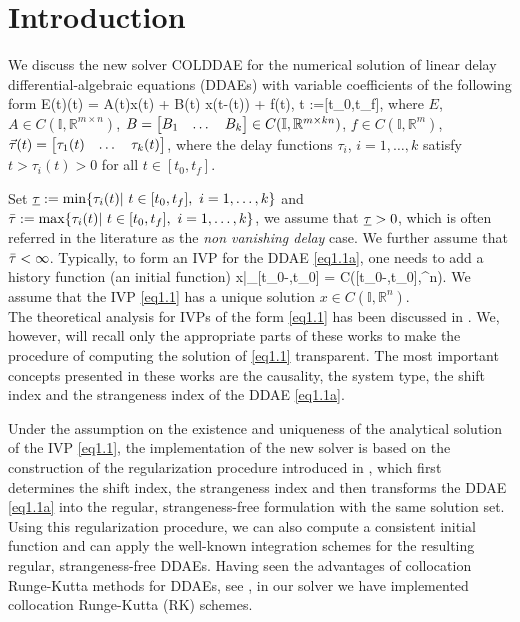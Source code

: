 \documentclass[final,reqno]{siamltex}
\begin{document}
\section{Introduction}
We discuss the new solver COLDDAE for the numerical solution of linear delay differential-algebraic equations (DDAEs) with variable coefficients of the following form
%
\bsq\label{eq1.1}
\be\label{eq1.1a}
 E(t)(t) = A(t)x(t) + B(t) x(t-\vtau(t)) + f(t), \quad t\in {} :=[t_0,t_f],
\ee
%
where $E$, $A \in C(\mathbb{I},\mathbb{R}^{m\times n})$, $B = \begin{bmatrix} B_1 & \dots & B_k \end{bmatrix} \in C(\mathbb{I},\mathbb{R}^{m\times kn})$, 
$f\in C(\mathbb{I},\mathbb{R}^{m})$, $\vec{\tau}(t) = \begin{bmatrix} \tau_1(t) & \dots & \tau_k(t) \end{bmatrix}$, 
where the delay functions $\tau_i$, $i=1,\dots,k$ satisfy $t > \tau_i(t) > 0$ for all $t\in [t_0,t_f]$.	

Set $\underline{\tau} := \min \{\tau_i(t)| \ t\in [t_0,t_f], \ i=1,\dots,k \}$ and $\bar{\tau} := \max \{\tau_i(t)| \ t\in [t_0,t_f], \ i=1,\dots,k \}$, 
we assume that $\underline{\tau} >0$, which is often referred in the literature \cite{BelC63,BakPT02} as the \emph{non vanishing delay} case. 
We further assume that $\bar{\tau} < \infty$. Typically, to form an IVP for the DDAE \eqref{eq1.1a}, one needs to add a history function (an initial function) 
%
\be
 x|_{[t_0-\otau,t_0]} = \phi \in C([t_0-\otau,t_0],\R^n).
\ee
%
We assume that the IVP \eqref{eq1.1} has a unique solution $x\in C(\mathbb{I},\mathbb{R}^n)$.\\
\esq
%
The theoretical analysis for IVPs of the form \eqref{eq1.1} has been discussed in \cite{HaMS14,HaM14}. 
We, however, will recall only the appropriate parts of these works to make the procedure of computing the solution of \eqref{eq1.1} transparent.
The most important concepts presented in these works are the causality, the system type, the shift index and the strangeness index of the DDAE \eqref{eq1.1a}.

Under the assumption on the existence and uniqueness of the analytical solution of the IVP \eqref{eq1.1}, the implementation of the new solver is based on the construction 
of the regularization procedure introduced in \cite{HaM14}, which first determines the shift index, the strangeness index and then transforms the DDAE \eqref{eq1.1a} into 
the regular, strangeness-free formulation with the same solution set. Using this regularization procedure, we can also compute a consistent initial function and can apply the 
well-known integration schemes for the resulting regular, strangeness-free DDAEs. 
Having seen the advantages of collocation Runge-Kutta methods for DDAEs, see \cite{GugH01,GugH07}, in our solver we have implemented collocation Runge-Kutta (RK) schemes. 
%
\end{document}
